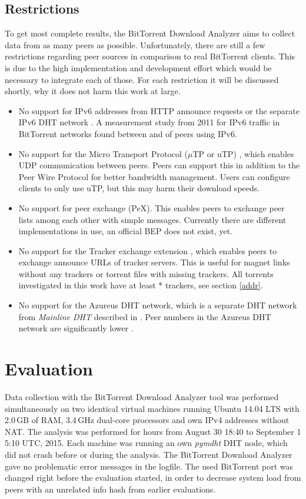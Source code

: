 \documentclass[10pt, a4paper, twoside=false, headsepline]{scrbook}
\renewcommand{\_}{\origunderscore\allowbreak}
\newcommand{\range}{from August 30 18:40 to September 1 5:10 UTC, 2015}
\begin{document}
\section{Restrictions}
\label{rest}
To get most complete results, the BitTorrent Download Analyzer aims to collect data from as many peers as possible. Unfortunately, there are still a few restrictions regarding peer sources in comparison to real BitTorrent clients. This is due to the high implementation and development effort which would be necessary to integrate each of those. For each restriction it will be discussed shortly, why it does not harm this work at large.
\begin{itemize}
\item No support for IPv6 addresses from HTTP announce requests \cite{bep7} or the separate IPv6 DHT network \cite{bep32}. A measurement study \cite[sec.~4.2.]{vyncke2012measuring} from 2011 for IPv6 traffic in BitTorrent networks found between  and  of peers using IPv6.
\item No support for the Micro Transport Protocol ($\mu$TP or uTP) \cite{bep29}, which enables UDP communication between peers. Peers can support this in addition to the Peer Wire Protocol for better bandwidth management. Users can configure clients to only use uTP, but this may harm their download speeds.
\item No support for peer exchange (PeX). This enables peers to exchange peer lists among each other with simple messages. Currently there are different implementations in use, an official BEP does not exist, yet.
\item No support for the Tracker exchange extension \cite{bep28}, which enables peers to exchange announce URLs of tracker servers. This is useful for magnet links without any trackers or torrent files with missing trackers. All torrents investigated in this work have at least * trackers, see section \ref{addr}.
\item No support for the Azureus DHT network, which is a separate DHT network from \emph{Mainline DHT} described in \cite{bep5}. Peer numbers in the Azureus DHT network are significantly lower \cite[table~5]{drachen2011distribution}.
\end{itemize}

\chapter{Evaluation}
\label{eval}
Data collection with the BitTorrent Download Analyzer tool was performed simultaneously on two identical virtual machines running Ubuntu 14.04 LTS with 2.0\,GB of RAM, 3.4\,GHz dual-core processors and own IPv4 addresses without NAT. The analysis was performed for  hours \range. Each machine was running an own \emph{pymdht} DHT node, which did not crash before or during the analysis. The BitTorrent Download Analyzer gave no problematic error messages in the logfile. The used BitTorrent port was changed right before the evaluation started, in order to decrease system load from peers with an unrelated info hash from earlier evaluations.
\end{document}
